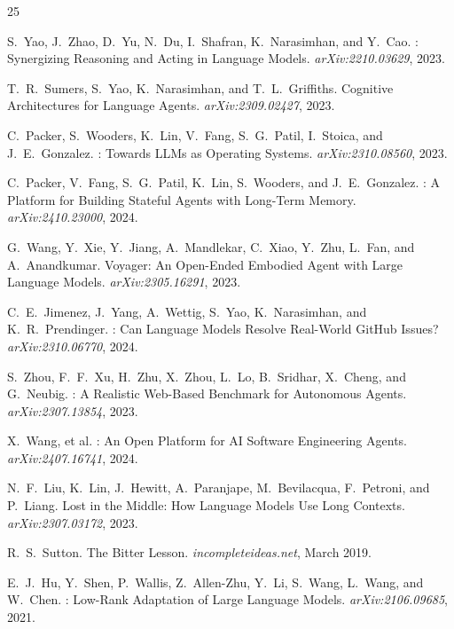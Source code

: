 \documentclass[11pt,a4paper]{article}
\begin{document}
\begin{thebibliography}{25}

S.~Yao, J.~Zhao, D.~Yu, N.~Du, I.~Shafran, K.~Narasimhan, and Y.~Cao.
: Synergizing Reasoning and Acting in Language Models.
\newblock \textit{arXiv:2210.03629}, 2023.

T.~R.~Sumers, S.~Yao, K.~Narasimhan, and T.~L.~Griffiths.
\newblock Cognitive Architectures for Language Agents.
\newblock \textit{arXiv:2309.02427}, 2023.

C.~Packer, S.~Wooders, K.~Lin, V.~Fang, S.~G.~Patil, I.~Stoica,
and J.~E.~Gonzalez.
: Towards {LLMs} as Operating Systems.
\newblock \textit{arXiv:2310.08560}, 2023.

C.~Packer, V.~Fang, S.~G.~Patil, K.~Lin, S.~Wooders, and J.~E.~Gonzalez.
: A Platform for Building Stateful Agents with Long-Term Memory.
\newblock \textit{arXiv:2410.23000}, 2024.

G.~Wang, Y.~Xie, Y.~Jiang, A.~Mandlekar, C.~Xiao, Y.~Zhu, L.~Fan,
and A.~Anandkumar.
\newblock Voyager: An Open-Ended Embodied Agent with Large Language Models.
\newblock \textit{arXiv:2305.16291}, 2023.

C.~E.~Jimenez, J.~Yang, A.~Wettig, S.~Yao, K.~Narasimhan, and K.~R.~Prendinger.
: Can Language Models Resolve Real-World GitHub Issues?
\newblock \textit{arXiv:2310.06770}, 2024.

S.~Zhou, F.~F.~Xu, H.~Zhu, X.~Zhou, L.~Lo, B.~Sridhar, X.~Cheng,
and G.~Neubig.
: A Realistic Web-Based Benchmark for Autonomous Agents.
\newblock \textit{arXiv:2307.13854}, 2023.

X.~Wang, et al.
: An Open Platform for AI Software Engineering Agents.
\newblock \textit{arXiv:2407.16741}, 2024.

N.~F.~Liu, K.~Lin, J.~Hewitt, A.~Paranjape, M.~Bevilacqua,
F.~Petroni, and P.~Liang.
\newblock Lost in the Middle: How Language Models Use Long Contexts.
\newblock \textit{arXiv:2307.03172}, 2023.

R.~S.~Sutton.
\newblock The Bitter Lesson.
\newblock \textit{incompleteideas.net}, March 2019.

E.~J.~Hu, Y.~Shen, P.~Wallis, Z.~Allen-Zhu, Y.~Li, S.~Wang, L.~Wang, and W.~Chen.
: Low-Rank Adaptation of Large Language Models.
\newblock \textit{arXiv:2106.09685}, 2021.


\end{thebibliography}
\end{document}
